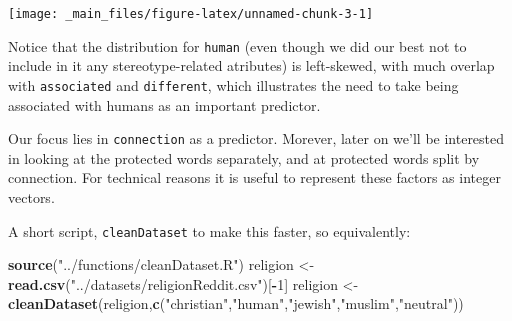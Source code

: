 \documentclass[]{book}
\newenvironment{Shaded}{\begin{snugshade}}{\end{snugshade}}
\newcommand{\KeywordTok}[1]{\textcolor[rgb]{0.13,0.29,0.53}{\textbf{#1}}}
\newcommand{\DecValTok}[1]{\textcolor[rgb]{0.00,0.00,0.81}{#1}}
\newcommand{\StringTok}[1]{\textcolor[rgb]{0.31,0.60,0.02}{#1}}
\newcommand{\OperatorTok}[1]{\textcolor[rgb]{0.81,0.36,0.00}{\textbf{#1}}}
\newcommand{\NormalTok}[1]{#1}
\begin{document}
\vspace{1mm} \footnotesize

\begin{center}\texttt{[image: \_main\_files/figure-latex/unnamed-chunk-3-1]} \end{center}

\normalsize

\noindent Notice that the distribution for \texttt{human} (even though
we did our best not to include in it any stereotype-related atributes)
is left-skewed, with much overlap with \texttt{associated} and
\texttt{different}, which illustrates the need to take being associated
with humans as an important predictor.

Our focus lies in \texttt{connection} as a predictor. Morever, later on
we'll be interested in looking at the protected words separately, and at
protected words split by connection. For technical reasons it is useful
to represent these factors as integer vectors.

\vspace{1mm} \footnotesize

\begin{Shaded}
\end{Shaded}

\normalsize

A short script, \texttt{cleanDataset} to make this faster, so
equivalently:

\vspace{1mm} \footnotesize

\begin{Shaded}
\begin{Highlighting}[]
\KeywordTok{source}\NormalTok{(}\StringTok{"../functions/cleanDataset.R"}\NormalTok{)}
\NormalTok{religion <-}\StringTok{ }\KeywordTok{read.csv}\NormalTok{(}\StringTok{"../datasets/religionReddit.csv"}\NormalTok{)[}\OperatorTok{-}\DecValTok{1}\NormalTok{]}
\NormalTok{religion <-}\StringTok{ }\KeywordTok{cleanDataset}\NormalTok{(religion,}\KeywordTok{c}\NormalTok{(}\StringTok{"christian"}\NormalTok{,}\StringTok{"human"}\NormalTok{,}\StringTok{"jewish"}\NormalTok{,}\StringTok{"muslim"}\NormalTok{,}\StringTok{"neutral"}\NormalTok{))}
\end{Highlighting}
\end{Shaded}
\end{document}
